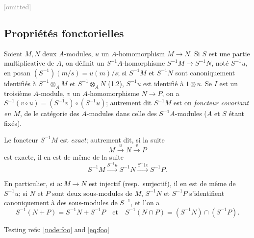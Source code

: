 \documentclass[french]{ega}
\begin{document}
\textcolor{gray}{[omitted]}

\setcounter{subsection}{2}
\subsection{Propriétés fonctorielles}

\begin{node}\label{node:foo}
  Soient \(M, N\) deux \(A\)-modules, \(u\) un \(A\)-homomorphism \(M\to N\). Si \(S\) est
  une partie multiplicative de \(A\), on définit un \(S^{-1}A\)-homorphisme
  \(S^{-1}M\to S^{-1}N\), noté \(S^{-1}u\), en posan \((S^{-1})(m/s) = u(m)/s\); si
  \(S^{-1}M\) et \(S^{-1}N\) sont canoniquement identifiés à
  \(S^{-1}\otimes_{A}M\) et \(S^{-1}\otimes_{A}N\) (1.2),
  \(S^{-1}u\) est identifié à \(1\otimes u\). Se \(I\) est un troisième
  \(A\)-module, \(v\) un \(A\)-homomorphisme \(N\to P\), on a \(S^{-1}(v\circ u) =
  (S^{-1}v)\circ (S^{-1}u)\); autrement dit \(S^{-1}M\) est on \emph{foncteur
  covariant en \(M\)}, de le catégorie des \(A\)-modules dans celle des
  \(S^{-1}A\)-modules (\(A\) et \(S\) étant fixés).
\end{node}

\begin{node}
  Le foncteur \(S^{-1}M\) est \emph{exact}; autrement dit, si la suite
  \begin{equation}
    M\xrightarrow{u} N\xrightarrow{v} P
  \end{equation}
  est exacte, il en est de même de la suite
  \begin{equation}
    S^{-1}M\xrightarrow{S^{-1}u}S^{-1}N\xrightarrow{S^-1v}S^{-1}P.
  \end{equation}

  En particulier, si \(u:M\to N\) est injectif (resp.\ surjectif), il en est de
  même de \(S^{-1}u\); si \(N\) et \(P\) sont deux sous-modules de \(M\), \(S^{-1}N\) et
  \(S^{-1}P\) s'identifient canoniquement à des sous-modules de \(S^{-1}\), et
  l'on a
  \begin{equation}\label{eq:foo}
    S^{-1}(N+P) = S^{-1}N+S^{-1}P\quad\text{et}\quad S^{-1}(N\cap P) = (S^{-1}N)\cap(S^{-1}P).
  \end{equation}
\end{node}

\begin{node}
  Testing refs: \cref{node:foo} and \cref{eq:foo}
\end{node}


\backmatter

\nocite{*}
\printbibliography
\end{document}

